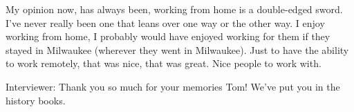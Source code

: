 My opinion now, has always been, working from home is a double-edged sword. I’ve never really been one that leans over one way or the other way. I enjoy working from home, I probably would have enjoyed working for them if they stayed in Milwaukee (wherever they went in Milwaukee). Just to have the ability to work remotely, that was nice, that was great. Nice people to work with.

\textcolor{interviewer}{Interviewer:} Thank you so much for your memories Tom! We’ve put you in the history books.